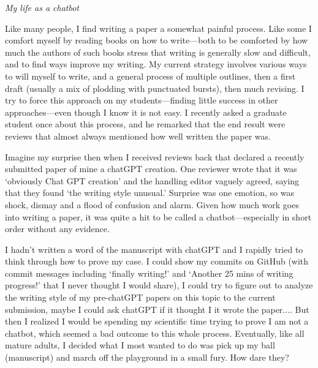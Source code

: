 \documentclass[11pt]{article}
\begin{document}

\renewcommand{\refname}{\CHead{}}


\emph{My life as a chatbot}%


Like many people, I find writing a paper a somewhat painful process. %
Like some I comfort myself by reading books on how to write---both to be comforted by how much the authors of such books stress that writing is generally slow and difficult, and to find ways improve my writing. My current strategy involves various ways to will myself to write, and a general process of multiple outlines, then a first draft (usually a mix of plodding with punctuated bursts), then much revising. I try to force this approach on my students---finding little success in other approaches---even though I know it is not easy. I recently asked a graduate student once about this process, and he remarked that the end result were reviews that almost always mentioned how well written the paper was. 

Imagine my surprise then when I received reviews back that declared a recently submitted paper of mine a chatGPT creation. One reviewer wrote that it was `obviously Chat GPT creation' and the handling editor vaguely agreed, saying that they found `the writing style unusual.' Surprise was one emotion, so was shock, dismay and a flood of confusion and alarm. Given how much work goes into writing a paper, it was quite a hit to be called a chatbot---especially in short order without any evidence. 

I hadn't written a word of the manuscript with chatGPT and I rapidly tried to think through how to prove my case. I could show my commits on GitHub (with commit messages including `finally writing!' and `Another 25 mins of writing progress!' that I never thought I would share), I could try to figure out to analyze the writing style of my pre-chatGPT papers on this topic to the current submission, maybe I could ask chatGPT if it thought I it wrote the paper.... But then I realized I would be spending my scientific time trying to prove I am not a chatbot, which seemed a bad outcome to this whole process. Eventually,  like all mature adults, I decided what I most wanted to do was pick up my ball (manuscript) and march off the playground in a small fury. How dare they? 
\end{document}
